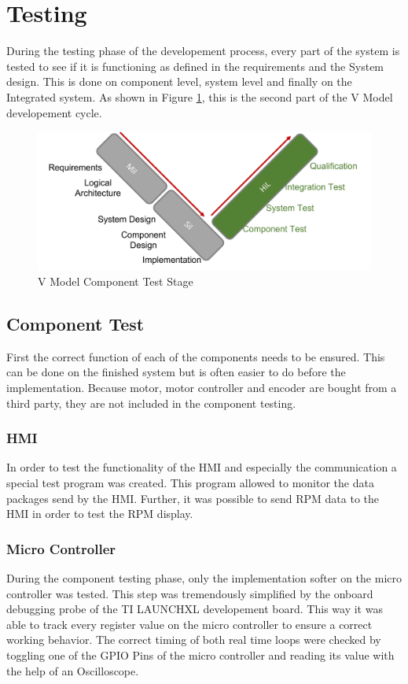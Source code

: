 \section{Testing}
During the testing phase of the developement process, every part of the system is tested to see if it is functioning as defined in the requirements and the System design. This is done on component level, system level and finally on the Integrated system. As shown in Figure \ref{V Model Component Test}, this is the second part of the V Model developement cycle.

\begin{figure}
    \begin{center}
    \includegraphics[width=12cm]{Pictures/V Model Component Test.png}
    \caption[V Model Component Test]{V Model Component Test Stage}
    \label{V Model Component Test}
    \end{center}
\end{figure}

\subsection{Component Test}
First the correct function of each of the components needs to be ensured. This can be done on the finished system but is often easier to do before the implementation. 
Because motor, motor controller and encoder are bought from a third party, they are not included in the component testing.

\subsubsection{HMI}
In order to test the functionality of the HMI and especially the communication a special test program was created. This program allowed to monitor the data packages send by the HMI. Further, it was possible to send RPM data to the HMI in order to test the RPM display.

\subsubsection{Micro Controller}
During the component testing phase, only the implementation softer on the micro controller was tested. This step was tremendously simplified by the onboard debugging probe of the TI LAUNCHXL developement board. This way it was able to track every register value on the micro controller to ensure a correct working behavior.
The correct timing of both real time loops were checked by toggling one of the GPIO Pins of the micro controller and reading its value with the help of an Oscilloscope.


